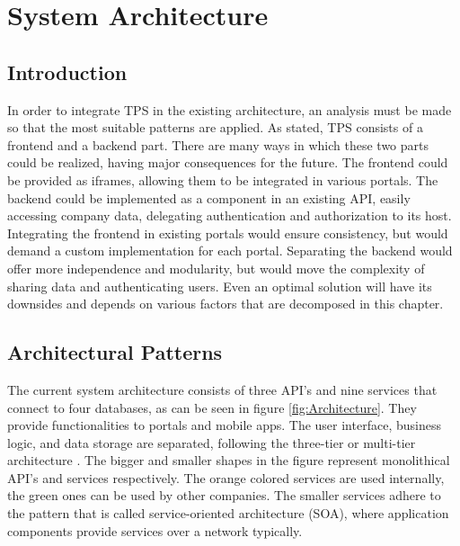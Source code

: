 \graphicspath{{Chapter3/Figs/Vector/}{Chapter3/Figs/}}

%
\chapter{System Architecture}
\section{Introduction}
In order to integrate TPS in the existing architecture, an analysis must be made so that the most suitable patterns are applied. As stated, TPS consists of a frontend and a backend part. There are many ways in which these two parts could be realized, having major consequences for the future. The frontend could be provided as iframes, allowing them to be integrated in various portals. The backend could be implemented as a component in an existing API, easily accessing company data, delegating authentication and authorization to its host. Integrating the frontend in existing portals would ensure consistency, but would demand a custom implementation for each portal. Separating the backend would offer more independence and modularity, but would move the complexity of sharing data and authenticating users. Even an optimal solution will have its downsides and depends on various factors that are decomposed in this chapter.

%
\section{Architectural Patterns}
The current system architecture consists of three API's and nine services that connect to four databases, as can be seen in figure \ref{fig:Architecture}. They provide functionalities to portals and mobile apps. The user interface, business logic, and data storage are separated, following the three-tier or multi-tier architecture \cite{IBM-3-tier}. The bigger and smaller shapes in the figure represent monolithical API's and services respectively. The orange colored services are used internally, the green ones can be used by other companies. The smaller services adhere to the pattern that is called service-oriented architecture (SOA), where application components provide services over a network typically.

